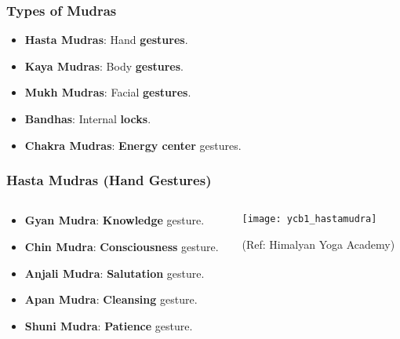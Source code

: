 \begin{frame}[fragile]\frametitle{Types of Mudras}

      \begin{itemize}
        \item \textbf{Hasta Mudras}: Hand \textbf{gestures}.
        \item \textbf{Kaya Mudras}: Body \textbf{gestures}.
        \item \textbf{Mukh Mudras}: Facial \textbf{gestures}.
        \item \textbf{Bandhas}: Internal \textbf{locks}.
        \item \textbf{Chakra Mudras}: \textbf{Energy center} gestures.
      \end{itemize}

\end{frame}

\begin{frame}[fragile]\frametitle{Hasta Mudras (Hand Gestures)}
\begin{columns}
    \begin{column}[T]{0.5\linewidth}
      \begin{itemize}
        \item \textbf{Gyan Mudra}: \textbf{Knowledge} gesture.
        \item \textbf{Chin Mudra}: \textbf{Consciousness} gesture.
        \item \textbf{Anjali Mudra}: \textbf{Salutation} gesture.
        \item \textbf{Apan Mudra}: \textbf{Cleansing} gesture.
        \item \textbf{Shuni Mudra}: \textbf{Patience} gesture.
      \end{itemize}
    \end{column}
    \begin{column}[T]{0.5\linewidth}
        \begin{center}
        \texttt{[image: ycb1\_hastamudra]}
				
		{\tiny (Ref: Himalyan Yoga Academy)}	 
        \end{center}	
    \end{column}
\end{columns}
\end{frame}

